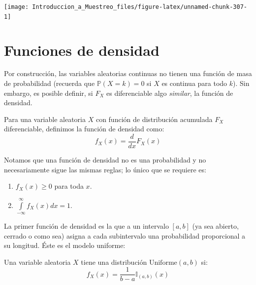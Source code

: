\documentclass[
]{book}
\providecommand{\tightlist}{%
  \setlength{\itemsep}{0pt}\setlength{\parskip}{0pt}}
\begin{document}
\begin{center}\texttt{[image: Introduccion\_a\_Muestreo\_files/figure-latex/unnamed-chunk-307-1]} \end{center}

\hypertarget{funciones-de-densidad}{%
\section{Funciones de densidad}\label{funciones-de-densidad}}

Por construcción, las variables aleatorias continuas no tienen una función de masa de probabilidad (recuerda que \(\mathbb{P}(X = k) = 0\) si \(X\) es continua para todo \(k\)). Sin embargo, es posible definir, si \(F_X\) es diferenciable algo \emph{similar}, la función de densidad.

Para una variable aleatoria \(X\) con función de distribución acumulada \(F_X\) diferenciable, definimos la función de densidad como:
\[
f_X(x) = \dfrac{d}{dx} F_X(x)
\]

Notamos que una función de densidad no es una probabilidad y no necesariamente sigue las mismas reglas; lo único que se requiere es:

\begin{enumerate}
\def\labelenumi{\arabic{enumi}.}
\tightlist
\item
  \(f_X(x) \geq 0\) para toda \(x\).
\item
  \(\int\limits_{-\infty}^{\infty} f_X(x) dx = 1\).
\end{enumerate}

La primer función de densidad es la que a un intervalo \([a,b]\) (ya sea abierto, cerrado o como sea) asigna a cada subintervalo una probabilidad proporcional a su longitud. Éste es el modelo uniforme:

Una variable aleatoria \(X\) tiene una distribución \(\text{Uniforme}(a,b)\) si:
\[
f_X(x) = \dfrac{1}{b-a}\mathbb{I}_{(a,b)}(x)
\]
\end{document}
